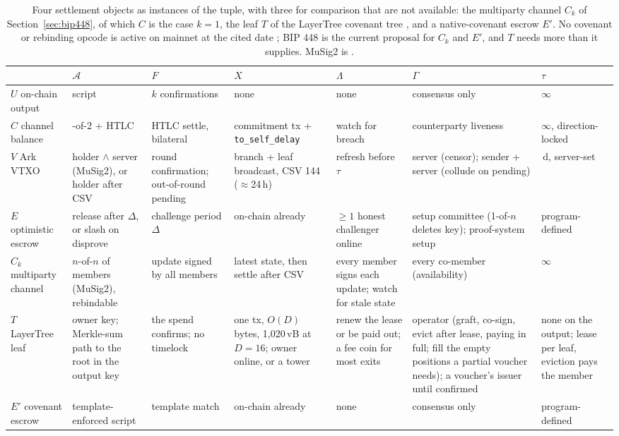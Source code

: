 \documentclass[11pt]{article}
\theoremstyle{plain}
\theoremstyle{definition}
\theoremstyle{remark}
\newcommand{\auth}{\mathcal{A}}
\begin{document}
\begin{table}[tp]
\centering
\footnotesize
\setlength{\tabcolsep}{3pt}
\begin{tabular}{@{}>{\raggedright\arraybackslash}p{1.9cm}>{\raggedright\arraybackslash}p{1.9cm}>{\raggedright\arraybackslash}p{1.9cm}>{\raggedright\arraybackslash}p{2.1cm}>{\raggedright\arraybackslash}p{1.7cm}>{\raggedright\arraybackslash}p{2.3cm}>{\raggedright\arraybackslash}p{1.5cm}@{}}
\toprule
 & $\auth$ & $F$ & $X$ & $\Lambda$ & $\Gamma$ & $\tau$ \\
\midrule
$U$ on-chain output & script & $k$ confirmations & none & none & consensus only & $\infty$ \\
$C$ channel balance & 2-of-2 + HTLC & HTLC settle, bilateral & commitment tx + \texttt{to\_self\_delay} & watch for breach & counterparty liveness & $\infty$, direction-locked \\
$V$ Ark VTXO & holder $\wedge$ server (MuSig2), or holder after CSV & round confirmation; out-of-round pending & branch + leaf broadcast, CSV 144 ($\approx$24\,h) & refresh before $\tau$ & server (censor); sender + server (collude on pending) & 28\,d, server-set \\
$E$ optimistic escrow & release after $\Delta$, or slash on disprove & challenge period $\Delta$ & on-chain already & $\ge 1$ honest challenger online & setup committee (1-of-$n$ deletes key); proof-system setup & program-defined \\
$C_k$ multiparty channel & $n$-of-$n$ of members (MuSig2), rebindable & update signed by all members & latest state, then settle after CSV & every member signs each update; watch for stale state & every co-member (availability) & $\infty$ \\
$T$ LayerTree leaf & owner key; Merkle-sum path to the root in the output key & the spend confirms; no timelock & one tx, $O(D)$ bytes, 1{,}020\,vB at $D=16$; owner online, or a tower & renew the lease or be paid out; a fee coin for most exits & operator (graft, co-sign, evict after lease, paying in full; fill the empty positions a partial voucher needs); a voucher's issuer until confirmed & none on the output; lease per leaf, eviction pays the member \\
$E'$ covenant escrow & template-enforced script & template match & on-chain already & none & consensus only & program-defined \\
\bottomrule
\end{tabular}
\caption{Four settlement objects as instances of the tuple, with three for comparison that are not available: the multiparty channel $C_k$ of Section~\ref{sec:bip448}, of which $C$ is the case $k=1$, the leaf $T$ of the LayerTree covenant tree \citep{osuntokun2026layertree}, and a native-covenant escrow $E'$. No covenant or rebinding opcode is active on mainnet at the cited date \citep{optech-ctv}; BIP 448 \citep{bip448} is the current proposal for $C_k$ and $E'$, and $T$ needs more than it supplies. MuSig2 is \citet{nick2021musig2}.}
\label{tab:objects}
\end{table}
\end{document}
